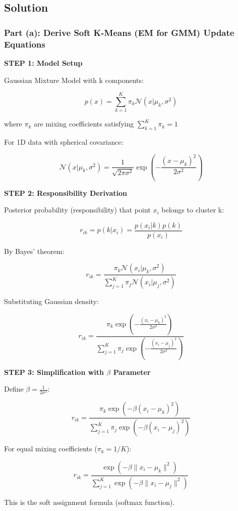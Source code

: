 \documentclass[12pt]{article}
\begin{document}
\subsection{Solution}

\subsubsection{Part (a): Derive Soft K-Means (EM for GMM) Update Equations}

\begin{solution}

\textbf{STEP 1: Model Setup}

Gaussian Mixture Model with k components:

\[
p(x) = \sum_{k=1}^K \pi_k \mathcal{N}(x | \mu_k, \sigma^2)
\]

where $\pi_k$ are mixing coefficients satisfying $\sum_{k=1}^K \pi_k = 1$

For 1D data with spherical covariance:

\[
\mathcal{N}(x | \mu_k, \sigma^2) = \frac{1}{\sqrt{2\pi\sigma^2}} \exp\left(-\frac{(x - \mu_k)^2}{2\sigma^2}\right)
\]

\textbf{STEP 2: Responsibility Derivation}

Posterior probability (responsibility) that point $x_i$ belongs to cluster k:

\[
r_{ik} = p(k | x_i) = \frac{p(x_i | k)p(k)}{p(x_i)}
\]

By Bayes' theorem:

\[
r_{ik} = \frac{\pi_k \mathcal{N}(x_i | \mu_k, \sigma^2)}{\sum_{j=1}^K \pi_j \mathcal{N}(x_i | \mu_j, \sigma^2)}
\]

Substituting Gaussian density:

\[
r_{ik} = \frac{\pi_k \exp\left(-\frac{(x_i - \mu_k)^2}{2\sigma^2}\right)}{\sum_{j=1}^K \pi_j \exp\left(-\frac{(x_i - \mu_j)^2}{2\sigma^2}\right)}
\]

\textbf{STEP 3: Simplification with $\beta$ Parameter}

Define $\beta = \frac{1}{2\sigma^2}$:

\[
r_{ik} = \frac{\pi_k \exp(-\beta(x_i - \mu_k)^2)}{\sum_{j=1}^K \pi_j \exp(-\beta(x_i - \mu_j)^2)}
\]

For equal mixing coefficients ($\pi_k = 1/K$):

\[
r_{ik} = \frac{\exp(-\beta \|x_i - \mu_k\|^2)}{\sum_{j=1}^K \exp(-\beta \|x_i - \mu_j\|^2)}
\]

This is the soft assignment formula (softmax function).


\end{solution}
\end{document}
